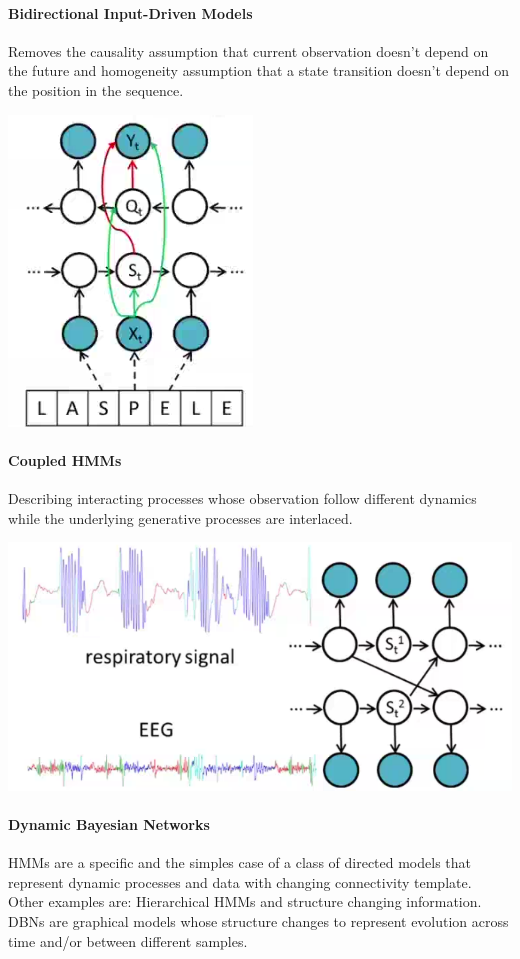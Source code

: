 \documentclass[10pt]{report}
\begin{document}
\paragraph{Bidirectional Input-Driven Models} Removes the causality assumption that current observation doesn't depend on the future and homogeneity assumption that a state transition doesn't depend on the position in the sequence.
\begin{center}
	\includegraphics[scale=0.5]{33.png}
\end{center}
\paragraph{Coupled HMMs} Describing interacting processes whose observation follow different dynamics while the underlying generative processes are interlaced.
\begin{center}
	\includegraphics[scale=0.5]{32.png}
\end{center}
\paragraph{Dynamic Bayesian Networks} HMMs are a specific and the simples case of a class of directed models that represent dynamic processes and data with changing connectivity template. Other examples are: Hierarchical HMMs and structure changing information.\\
DBNs are graphical models whose structure changes to represent evolution across time and/or between different samples.
\end{document}
